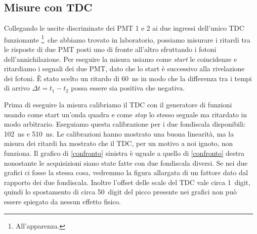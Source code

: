 \subsection{Misure con TDC}

Collegando le uscite discriminate dei PMT 1 e 2 ai due ingressi dell'unico TDC funzionante%
\footnote{All'apparenza.}%
\,che abbiamo trovato in laboratorio, possiamo misurare i ritardi tra le risposte di due PMT posti uno di fronte all'altro sfruttando i fotoni dell'annichilazione. Per eseguire la misura usiamo come \emph{start} le coincidenze e ritardiamo i segnali dei due PMT, dato che lo start è successivo alla rivelazione dei fotoni. \`E stato scelto un ritardo di \SI{60}{ns} in modo che la differenza tra i tempi di arrivo $\Delta t=t_1-t_2$ possa essere sia positiva che negativa.


Prima di eseguire la misura calibriamo il TDC con il generatore di funzioni usando come start un'onda quadra e come \emph{stop} lo stesso segnale ma ritardato in modo arbitrario.
Eseguiamo questa calibrazione per i due fondiscala disponibili: \SI{102}{ns} e \SI{510}{ns}.
Le calibrazioni hanno mostrato una buona linearità, ma la misura dei ritardi ha mostrato che il TDC, per un motivo a noi ignoto, non funziona.
Il grafico di \autoref{confronto} sinistra è uguale a quello di \autoref{confronto} destra
nonostante le acquisizioni siano state fatte con due fondiscala diversi. Se nei due grafici ci fosse la stessa cosa, vedremmo la figura allargata di un fattore dato dal rapporto dei due fondiscala. Inoltre l'offset delle scale del TDC vale circa \SI{1}{digit}, quindi lo spostamento di circa \SI{50}{digit} del picco presente nei grafici non può essere spiegato da nessun effetto fisico.

